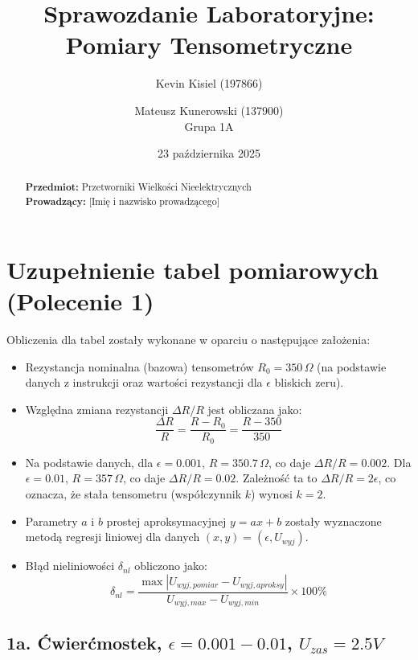 \documentclass[12pt, a4paper]{article}
\title{Sprawozdanie Laboratoryjne: Pomiary Tensometryczne}
\author{Kevin Kisiel (197866) \and Mateusz Kunerowski (137900) \\ Grupa 1A}
\date{23 października 2025}
\begin{document}
	
	\maketitle
	
	\begin{abstract}
		\noindent \textbf{Przedmiot:} Przetworniki Wielkości Nieelektrycznych \\
		\textbf{Prowadzący:} [Imię i nazwisko prowadzącego]
	\end{abstract}
	
	\hrulefill
	\vspace{1em}
	
	\section{Uzupełnienie tabel pomiarowych (Polecenie 1)}
	
	Obliczenia dla tabel zostały wykonane w oparciu o następujące założenia:
	\begin{itemize}
		\item Rezystancja nominalna (bazowa) tensometrów $R_0 = 350 \, \Omega$ (na podstawie danych z instrukcji oraz wartości rezystancji dla $\epsilon$ bliskich zeru).
		\item Względna zmiana rezystancji $\Delta R / R$ jest obliczana jako:
		$$ \frac{\Delta R}{R} = \frac{R - R_0}{R_0} = \frac{R - 350}{350} $$
		\item Na podstawie danych, dla $\epsilon = 0.001$, $R = 350.7 \, \Omega$, co daje $\Delta R/R = 0.002$. Dla $\epsilon = 0.01$, $R = 357 \, \Omega$, co daje $\Delta R/R = 0.02$. Zależność ta to $\Delta R/R = 2\epsilon$, co oznacza, że stała tensometru (współczynnik $k$) wynosi \textbf{$k=2$}.
		\item Parametry $a$ i $b$ prostej aproksymacyjnej $y = ax + b$ zostały wyznaczone metodą regresji liniowej dla danych $(x, y) = (\epsilon, U_{wyj})$.
		\item Błąd nieliniowości $\delta_{nl}$ obliczono jako:
		$$ \delta_{nl} = \frac{\max|U_{wyj, pomiar} - U_{wyj, aproksy}|}{U_{wyj, max} - U_{wyj, min}} \times 100\% $$
	\end{itemize}
	
	\subsection{1a. Ćwierćmostek, $\epsilon = 0.001-0.01$, $U_{zas} = 2.5 V$}
	
\end{document}
